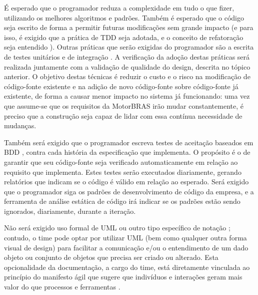 \documentclass[12pt,journal,compsoc]{IEEEtran}
\begin{document}
É esperado que o programador reduza a complexidade em tudo o que fizer, utilizando os melhores algoritmos e padrões. Também é esperado que o código seja escrito de forma a permitir futuras modificações sem grande impacto (e para isso, é exigido que a prática de TDD seja adotada, e o conceito de refatoração seja entendido \cite{Fowler1999}). Outras práticas que serão exigidas do programador são a escrita de testes unitários e de integração \cite{unit_int_func_testing}. A verificação da adoção destas práticas será realizada juntamente com a validação de qualidade do design, descrita no tópico anterior. O objetivo destas técnicas é reduzir o custo e o risco na modificação de código-fonte existente e na adição de novo código-fonte sobre código-fonte já existente, de forma a causar menor impacto no sistema já funcionando: uma vez que assume-se que os requisitos da MotorBRAS irão mudar constantemente, é preciso que a construção seja capaz de lidar com essa contínua necessidade de mudanças.

Também será exigido que o programador escreva testes de aceitação baseados em BDD \cite{chelimsky2010rspec}, contra cada história da especificação que implementa. O propósito é o de garantir que seu código-fonte seja verificado automaticamente em relação ao requisito que implementa. Estes testes serão executados diariamente, gerando relatórios que indicam se o código é válido em relação ao esperado. Será exigido que o programador siga os padrões de desenvolvimento de código da empresa, e a ferramenta de análise estática de código irá indicar se os padrões estão sendo ignorados, diariamente, durante a iteração. 

Não será exigido uso formal de UML ou outro tipo específico de notação \cite{society_software_2004}; contudo, o time pode optar por utilizar UML (bem como qualquer outra forma visual de design) para facilitar a comunicação e/ou o entendimento de um dado objeto ou conjunto de objetos que precisa ser criado ou alterado. %
Esta opcionalidade da documentação, a cargo do time, está diretamente vinculada ao princípio do manifesto ágil que sugere que indivíduos e interações geram mais valor do que processos e ferramentas \cite{agilemanifesto}.
\end{document}
